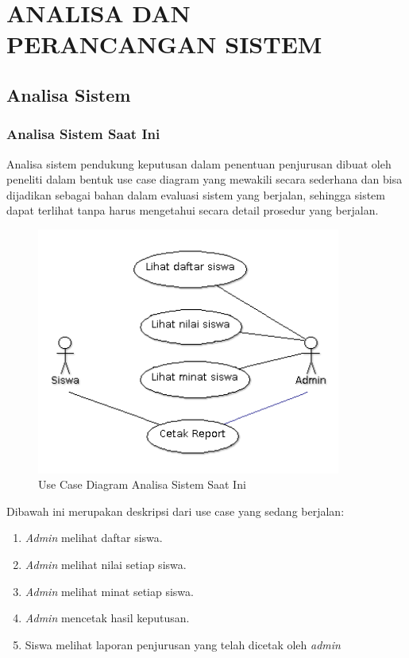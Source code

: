\chapter{ANALISA DAN PERANCANGAN SISTEM}

%
\vspace{4.5pt}

\section{Analisa Sistem}

\subsection{Analisa Sistem Saat Ini}
Analisa sistem pendukung keputusan dalam penentuan penjurusan dibuat oleh peneliti dalam bentuk use case diagram yang mewakili secara sederhana dan bisa dijadikan sebagai bahan dalam evaluasi sistem yang berjalan, sehingga sistem dapat terlihat tanpa harus mengetahui secara detail prosedur yang berjalan.
\begin{figure}[ht]
	\centering
	\includegraphics[width=10cm]{images/UseCaseDiagramSistemSaatIni}
	\caption{Use Case Diagram Analisa Sistem Saat Ini}
\end{figure}

\newpage
\noindent Dibawah ini merupakan deskripsi dari use case yang sedang berjalan:
\begin{enumerate}[nolistsep,leftmargin=0.5cm]
\item \textit{Admin} melihat daftar siswa.
\item \textit{Admin} melihat nilai setiap siswa.
\item \textit{Admin} melihat minat setiap siswa.
\item \textit{Admin} mencetak hasil keputusan.
\item Siswa melihat laporan penjurusan yang telah dicetak oleh \textit{admin}
\end{enumerate}

